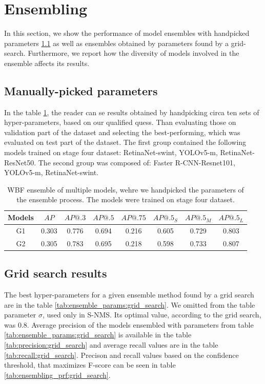 \section{Ensembling}
\label{sec:ensembling_results}
In this section, we show the performance of model ensembles with handpicked parameters \ref{subsec:handpicked} as well as ensembles obtained by parameters found by a grid-search. Furthermore, we report how the diversity of models involved in the ensemble affects its results.
\subsection{Manually-picked parameters}
\label{subsec:handpicked}
In the table \ref{tab:model_ensembling:handpicked}, the reader can se results obtained by handpicking circa ten sets of hyper-parameters, based on our qualified quess. Than evaluating those on validation part of the dataset and selecting the best-performing, which was evaluated on test part of the dataset. The first group contained the following models trained on stage four dataset: RetinaNet-swint, YOLOv5-m, RetinaNet-ResNet50. The second group was composed of: Faster R-CNN-Resnet101, YOLOv5-m, RetinaNet-swint.
\begin{table}[H]
    \begin{tabular}{|c|c|c|c|c|c|c|c|}
        \hline
        Models & $AP$  & $AP@.3$ & $AP@.5$ & $AP@.75$ & $AP@.5_S$ & $AP@.5_M$ & $AP@.5_L$ \\ \hline
        G1     & 0.303 & 0.776   & 0.694   & 0.216    & 0.605     & 0.729     & 0.803     \\ \hline
        G2     & 0.305 & 0.783   & 0.695   & 0.218    & 0.598     & 0.733     & 0.807     \\ \hline
    \end{tabular}
    \caption{WBF ensemble of multiple models, wehre we handpicked the parameters of the ensemble process. The models were trained on stage four dataset.}
    \label{tab:model_ensembling:handpicked}
\end{table}
\subsection{Grid search results}
\label{subsec:gridsearched}
The best hyper-parameters for a given ensemble method found by a grid search are in the table \ref{tab:ensemble_params:grid_search}. We omitted from the table parameter $\sigma$, used only in S-NMS. Its optimal value, according to the grid search, was $0.8$.
Average precision of the models ensembled with parameters from table \ref{tab:ensemble_params:grid_search} is available in the table \ref{tab:precision:grid_search} and average recall values are in the table \ref{tab:recall:grid_search}. Precison and recall values based on the confidence threshold, that maximizes F-score can be seen in table \ref{tab:ensembling_prf:grid_search}.


